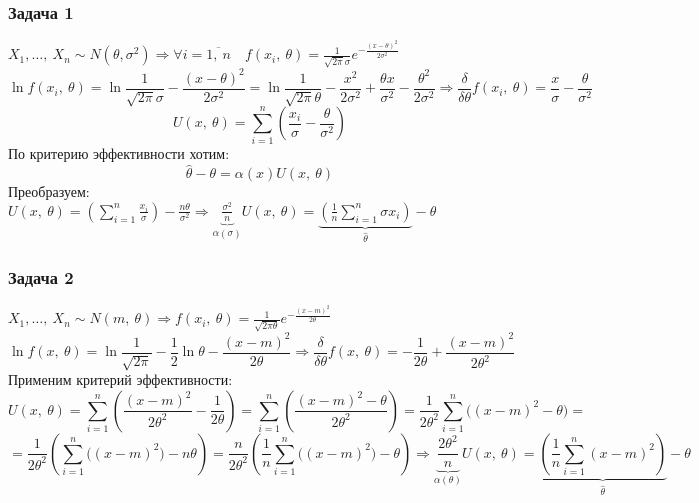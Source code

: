 \documentclass[12pt, a4paper]{article}
\begin{document}
\subsubsection*{Задача 1}
$X_1,\dots,\ X_n\sim N(\theta, \sigma^2)\Rightarrow \forall i = \overline{1,\ n}\quad f(x_i,\ \theta) = \frac{1}{\sqrt{2\pi}\sigma} e^{-\frac{(x - \theta)^2}{2\sigma^2}}$\\
\[\ln f(x_i,\ \theta) = \ln \frac{1}{\sqrt{2\pi}\sigma} - \frac{(x - \theta)^2}{2\sigma^2} = \ln \frac{1}{\sqrt{2\pi}\theta} - \frac{x^2}{2\sigma^2} + \frac{\theta x}{\sigma^2} - \frac{\theta^2}{2\sigma^2}\Rightarrow \frac{\delta}{\delta \theta} f(x_i,\ \theta) = \frac{x}{\sigma} - \frac{\theta}{\sigma^2}\]
\[U(x,\ \theta) = \sum\limits_{i = 1}^{n}\left( \frac{x_i}{\sigma} - \frac{\theta}{\sigma^2} \right)\]
По критерию эффективности хотим:
\[\hat{\theta} - \theta = \alpha(x)U(x,\ \theta)\]
Преобразуем: $U(x,\ \theta) = \left(\sum\limits_{i = 1}^{n} \frac{x_i}{\sigma}\right) - \frac{n\theta}{\sigma^2}\Rightarrow \underset{\alpha(\sigma)}{\underbrace{\frac{\sigma^2}{n}}} U(x,\ \theta) = \underset{\hat{\theta}}{\underbrace{\left(\frac{1}{n}\sum\limits_{i = 1}^{n} \sigma x_i \right)}} - \theta$
\subsubsection*{Задача 2}
$X_1,\dots,\ X_n\sim N(m,\ \theta)\Rightarrow f(x_i,\ \theta) = \frac{1}{\sqrt{2\pi\theta}} e^{-\frac{(x - m)^2}{2\theta}}$\\
\[\ln f(x,\ \theta) = \ln \frac{1}{\sqrt{2\pi}} - \frac{1}{2}\ln \theta - \frac{(x - m)^2}{2\theta}\Rightarrow \frac{\delta}{\delta \theta} f(x,\ \theta) = -\frac{1}{2\theta} + \frac{(x - m)^2}{2\theta^2}\]
Применим критерий эффективности:
\[U(x,\ \theta) = \sum\limits_{i = 1}^{n} \left( \frac{(x - m)^2}{2\theta^2} - \frac{1}{2\theta} \right) = \sum\limits_{i = 1}^{n} \left( \frac{(x - m)^2 - \theta}{2\theta^2}\right) = \frac{1}{2\theta^2} \sum\limits_{i = 1}^{n} \big((x - m)^2 - \theta\big) = \]
\[= \frac{1}{2\theta^2} \left( \sum\limits_{i = 1}^{n} \big((x - m)^2\big) - n\theta\right) = \frac{n}{2\theta^2} \left( \frac{1}{n} \sum\limits_{i = 1}^{n} \big((x - m)^2\big) - \theta\right)\Rightarrow \underset{\alpha(\theta)}{\underbrace{\frac{2\theta^2}{n}}} U(x,\ \theta) = \underset{\hat{\theta}}{\underbrace{\left(\frac{1}{n} \sum\limits_{i = 1}^{n} (x - m)^2\right)}} - \theta\]
\end{document}
